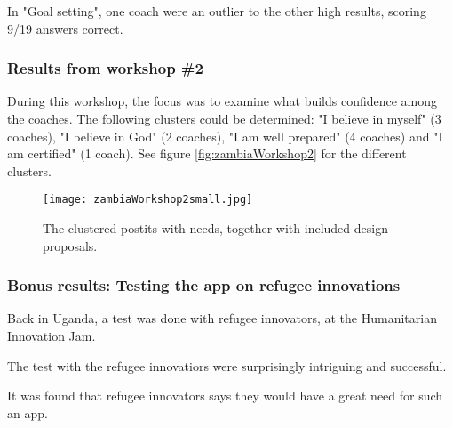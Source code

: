     In "Goal setting", one coach were an outlier to the other high results, scoring 9/19 answers correct.

    \subsubsection{Results from workshop \#2}

    During this workshop, the focus was to examine what builds confidence among the coaches. The following clusters could be determined: "I believe in myself" (3 coaches), "I believe in God" (2 coaches), "I am well prepared" (4 coaches) and "I am certified" (1 coach). See figure \ref{fig:zambiaWorkshop2} for the different clusters.

    \begin{figure}[h]
        \centering
        \texttt{[image: zambiaWorkshop2small.jpg]}
        \caption{The clustered postits with needs, together with included design proposals.}
        \label{fig:iteration}
    \end{figure}

    \subsubsection{Bonus results: Testing the app on refugee innovations}
    Back in Uganda, a test was done with refugee innovators, at the Humanitarian Innovation Jam.

    The test with the refugee innovatiors were surprisingly intriguing and successful.

    It was found that refugee innovators says they would have a great need for such an app.
